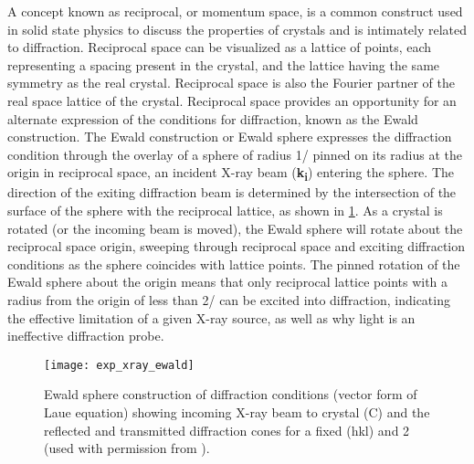 A concept known as reciprocal, or momentum space, is a common construct used in solid state physics to discuss the properties of crystals and is intimately related to diffraction.
Reciprocal space can be visualized as a lattice of points, each representing a spacing present in the crystal, and the lattice having the same symmetry as the real crystal.
Reciprocal space is also the Fourier partner of the real space lattice of the crystal.
Reciprocal space provides an opportunity for an alternate expression of the conditions for diffraction, known as the Ewald construction.
The Ewald construction or Ewald sphere expresses the diffraction condition through the overlay of a sphere of radius 1/\textlambda{} pinned on its radius at the origin in reciprocal space, an incident X-ray beam (\textbf{k\textsubscript{i}}) entering the sphere.
The direction of the exiting diffraction beam is determined by the intersection of the surface of the sphere with the reciprocal lattice, as shown in \cref{fig:exp_xray_ewald}.
As a crystal is rotated (or the incoming beam is moved), the Ewald sphere will rotate about the reciprocal space origin, sweeping through reciprocal space and exciting diffraction conditions as the sphere coincides with lattice points.
The pinned rotation of the Ewald sphere about the origin means that only reciprocal lattice points with a radius from the origin of less than 2/\textlambda{} can be excited into diffraction, indicating the effective limitation of a given X-ray source, as well as why light is an ineffective diffraction probe.
\begin{figure}
 \centering \texttt{[image: exp\_xray\_ewald]}
 \caption[Ewald sphere]{\label{fig:exp_xray_ewald}Ewald sphere construction of diffraction conditions (vector form of Laue equation) showing incoming X-ray beam to crystal (C) and the reflected and transmitted diffraction cones for a fixed (hkl) and 2\straighttheta{} (used with permission from \cite{He2009}).}
\end{figure}

